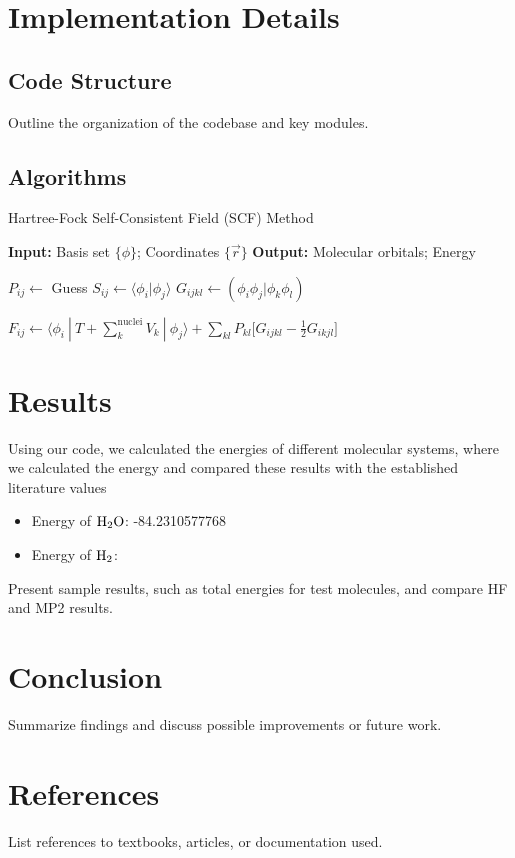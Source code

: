 \documentclass[12pt]{article}
\begin{document}
\section{Implementation Details}

\subsection{Code Structure}
Outline the organization of the codebase and key modules.

\subsection{Algorithms}

\begin{algorithm}
\caption{Hartree-Fock Self-Consistent Field (SCF) Method}
\begin{algorithmic}[1]

\Statex \textbf{Input:} Basis set $\{\phi\}$; Coordinates $\{\vec{r}\}$
\Statex \textbf{Output:} Molecular orbitals; Energy

\State $P_{ij} \gets $ Guess
\State $S_{ij} \gets \langle \phi_i | \phi_j \rangle$ 
\State $G_{ijkl} \gets (\phi_i\phi_j|\phi_k\phi_l)$ 

    \State $F_{ij} \gets \langle \phi_i \: | \: T + \sum_k^{\text{nuclei}}V_k \: |\: \phi_j \rangle + \sum_{kl} P_{kl} \Big[ G_{ijkl} - \frac{1}{2} G_{ikjl} \Big]$

\EndWhile


\end{algorithmic}
\end{algorithm}

\section{Results}
Using our code, we calculated the energies of different molecular systems, where we calculated the energy and compared these results with the established literature values
\begin{itemize}
    \item Energy of $\ce{H2O}$: -84.2310577768
    \item Energy of $\ce{H2}$:
\end{itemize}
Present sample results, such as total energies for test molecules, and compare HF and MP2 results.

\section{Conclusion}
Summarize findings and discuss possible improvements or future work.

\section*{References}
List references to textbooks, articles, or documentation used.
\end{document}
